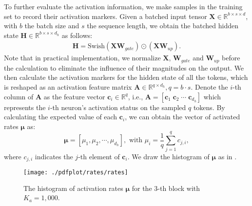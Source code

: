 To further evaluate the activation information, we make samples in the training set to record their activation markers.
Given a batched input tensor $\mathbf{X} \in \mathbb{R}^{b\times s\times d}$, with $b$ the batch size and $s$ the sequence length, we obtain the batched hidden state $\mathbf{H} \in \mathbb{R}^{b\times s\times d_h}$ as follows:
\begin{align}
\label{eq:h_matrix}
    \mathbf{H} = \text{Swish}(\mathbf{X}\mathbf{W}_{gate})\odot(\mathbf{X}\mathbf{W}_{up}).
\end{align}
Note that in practical implementation, we normalize $\mathbf{X}$, $\mathbf{W}_{gate}$ and $\mathbf{W}_{up}$ before the calculation to eliminate the influence of their magnitudes on the output.
We then calculate the activation markers for the hidden state of all the tokens, which is reshaped as an activation feature matrix $\mathbf{A} \in \mathbb{R}^{q \times d_h}, q = b\cdot s$.
Denote the $i$-th column of $\mathbf{A}$ as the feature vector $\mathbf{c}_i \in \mathbb{R}^{q}$, 
i.e., $\mathbf{A} =[ \mathbf{c}_1\; \mathbf{c}_2 \; \cdots \; \mathbf{c}_{d_h}]$
which represents the $i$-th neuron's activation status on the sampled $q$ tokens.
By calculating the expected value of each $\mathbf{c}_i$, we can obtain the vector of activated rates $\boldsymbol{\mu}$ as:
    \begin{equation}\label{eq:mu}
            \boldsymbol{\mu} = [ \mu_1,\mu_2, \cdots, \mu_{d_h}], \mbox{ with } 
            \mu_i =\frac{1}{q} \sum_{j=1}^{q} c_{j,i},
    \end{equation}
where $c_{j,i}$ indicates the $j$-th element of $\mathbf{c}_i$.
We draw the histogram of $\boldsymbol{\mu}$ as in . 
\begin{figure}[tb!]
    \centering
    \texttt{[image: ./pdfplot/rates/rates]}\vspace{-2mm}
    \caption{The histogram of activation rates $\boldsymbol{\mu}$ for the $3$-th block with $K_a = 1,000$.
    }
    \label{fig:rates}\vspace{1mm}
\end{figure}
